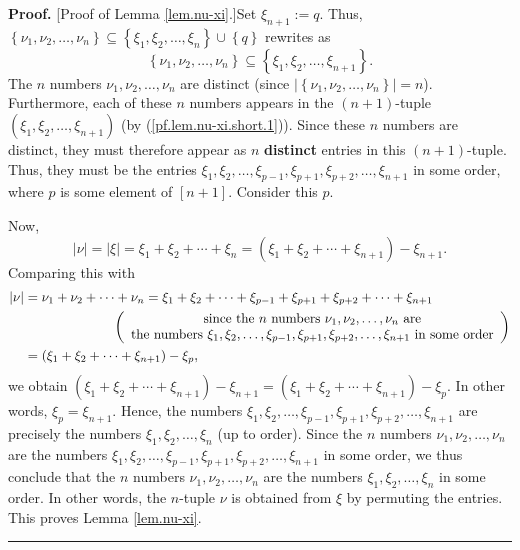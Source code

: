 \documentclass[numbers=enddot,12pt,final,onecolumn,notitlepage,english]{scrartcl}%
\theoremstyle{definition}
\newenvironment{proof}[1][Proof]{\noindent\textbf{#1.} }{\ \rule{0.5em}{0.5em}}
\newenvironment{vershort}{}{}
\begin{document}
\begin{vershort}
\begin{proof}
[Proof of Lemma \ref{lem.nu-xi}.]Set $\xi_{n+1}:=q$. Thus, $\left\{  \nu
_{1},\nu_{2},\ldots,\nu_{n}\right\}  \subseteq\left\{  \xi_{1},\xi_{2}%
,\ldots,\xi_{n}\right\}  \cup\left\{  q\right\}  $ rewrites as
\begin{equation}
\left\{  \nu_{1},\nu_{2},\ldots,\nu_{n}\right\}  \subseteq\left\{  \xi_{1}%
,\xi_{2},\ldots,\xi_{n+1}\right\}  . \label{pf.lem.nu-xi.short.1}%
\end{equation}
The $n$ numbers $\nu_{1},\nu_{2},\ldots,\nu_{n}$ are distinct (since
$\left\vert \left\{  \nu_{1},\nu_{2},\ldots,\nu_{n}\right\}  \right\vert =n$).
Furthermore, each of these $n$ numbers appears in the $\left(  n+1\right)
$-tuple $\left(  \xi_{1},\xi_{2},\ldots,\xi_{n+1}\right)  $ (by
(\ref{pf.lem.nu-xi.short.1})). Since these $n$ numbers are distinct, they must
therefore appear as $n$ \textbf{distinct} entries in this $\left(  n+1\right)
$-tuple. Thus, they must be the entries $\xi_{1},\xi_{2},\ldots,\xi_{p-1}%
,\xi_{p+1},\xi_{p+2},\ldots,\xi_{n+1}$ in some order, where $p$ is some
element of $\left[  n+1\right]  $. Consider this $p$.

Now,%
\[
\left\vert \nu\right\vert =\left\vert \xi\right\vert =\xi_{1}+\xi_{2}%
+\cdots+\xi_{n}=\left(  \xi_{1}+\xi_{2}+\cdots+\xi_{n+1}\right)  -\xi_{n+1}.
\]
Comparing this with%
\begin{align*}
\left\vert \nu\right\vert  &  =\nu_{1}+\nu_{2}+\cdots+\nu_{n}=\xi_{1}+\xi
_{2}+\cdots+\xi_{p-1}+\xi_{p+1}+\xi_{p+2}+\cdots+\xi_{n+1}\\
&  \ \ \ \ \ \ \ \ \ \ \ \ \ \ \ \ \ \ \ \ \left(
\begin{array}
[c]{c}%
\text{since the }n\text{ numbers }\nu_{1},\nu_{2},\ldots,\nu_{n}\text{ are}\\
\text{the numbers }\xi_{1},\xi_{2},\ldots,\xi_{p-1},\xi_{p+1},\xi_{p+2}%
,\ldots,\xi_{n+1}\text{ in some order}%
\end{array}
\right) \\
&  =\left(  \xi_{1}+\xi_{2}+\cdots+\xi_{n+1}\right)  -\xi_{p},
\end{align*}
we obtain $\left(  \xi_{1}+\xi_{2}+\cdots+\xi_{n+1}\right)  -\xi_{n+1}=\left(
\xi_{1}+\xi_{2}+\cdots+\xi_{n+1}\right)  -\xi_{p}$. In other words, $\xi
_{p}=\xi_{n+1}$. Hence, the numbers $\xi_{1},\xi_{2},\ldots,\xi_{p-1}%
,\xi_{p+1},\xi_{p+2},\ldots,\xi_{n+1}$ are precisely the numbers $\xi_{1}%
,\xi_{2},\ldots,\xi_{n}$ (up to order). Since the $n$ numbers $\nu_{1},\nu
_{2},\ldots,\nu_{n}$ are the numbers $\xi_{1},\xi_{2},\ldots,\xi_{p-1}%
,\xi_{p+1},\xi_{p+2},\ldots,\xi_{n+1}$ in some order, we thus conclude that
the $n$ numbers $\nu_{1},\nu_{2},\ldots,\nu_{n}$ are the numbers $\xi_{1}%
,\xi_{2},\ldots,\xi_{n}$ in some order. In other words, the $n$-tuple $\nu$ is
obtained from $\xi$ by permuting the entries. This proves Lemma
\ref{lem.nu-xi}.
\end{proof}
\end{vershort}
\end{document}
